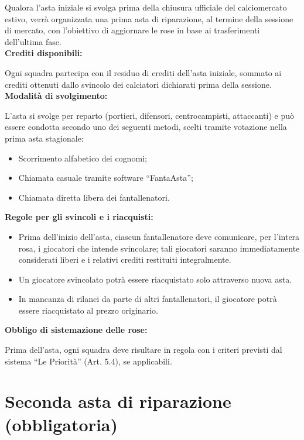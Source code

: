 Qualora l’asta iniziale si svolga prima della chiusura ufficiale del calciomercato estivo, verrà organizzata una prima asta di riparazione, al termine della sessione di mercato, con l’obiettivo di aggiornare le rose in base ai trasferimenti dell’ultima fase. \\

\noindent \textbf{Crediti disponibili:}

Ogni squadra partecipa con il residuo di crediti dell’asta iniziale, sommato ai crediti ottenuti dallo svincolo dei calciatori dichiarati prima della sessione.\\

\noindent \textbf{Modalità di svolgimento:}

L’asta si svolge per reparto (portieri, difensori, centrocampisti, attaccanti) e può essere condotta secondo uno dei seguenti metodi, scelti tramite votazione nella prima asta stagionale:
\begin{itemize}
  \item Scorrimento alfabetico dei cognomi;
  \item Chiamata casuale tramite software “FantaAsta”;
  \item Chiamata diretta libera dei fantallenatori.
\end{itemize}

\noindent \textbf{Regole per gli svincoli e i riacquisti:}
\begin{itemize}
  \item Prima dell’inizio dell’asta, ciascun fantallenatore deve comunicare, per l’intera rosa, i giocatori che intende svincolare; tali giocatori saranno immediatamente considerati liberi e i relativi crediti restituiti integralmente.
  \item Un giocatore svincolato potrà essere riacquistato solo attraverso nuova asta.
  \item In mancanza di rilanci da parte di altri fantallenatori, il giocatore potrà essere riacquistato al prezzo originario.
\end{itemize}

\noindent  \textbf{Obbligo di sistemazione delle rose:}

Prima dell’asta, ogni squadra deve risultare in regola con i criteri previsti dal sistema “Le Priorità” (Art. 5.4), se applicabili.

\section{Seconda asta di riparazione (obbligatoria)}
\label{art:5.2}

